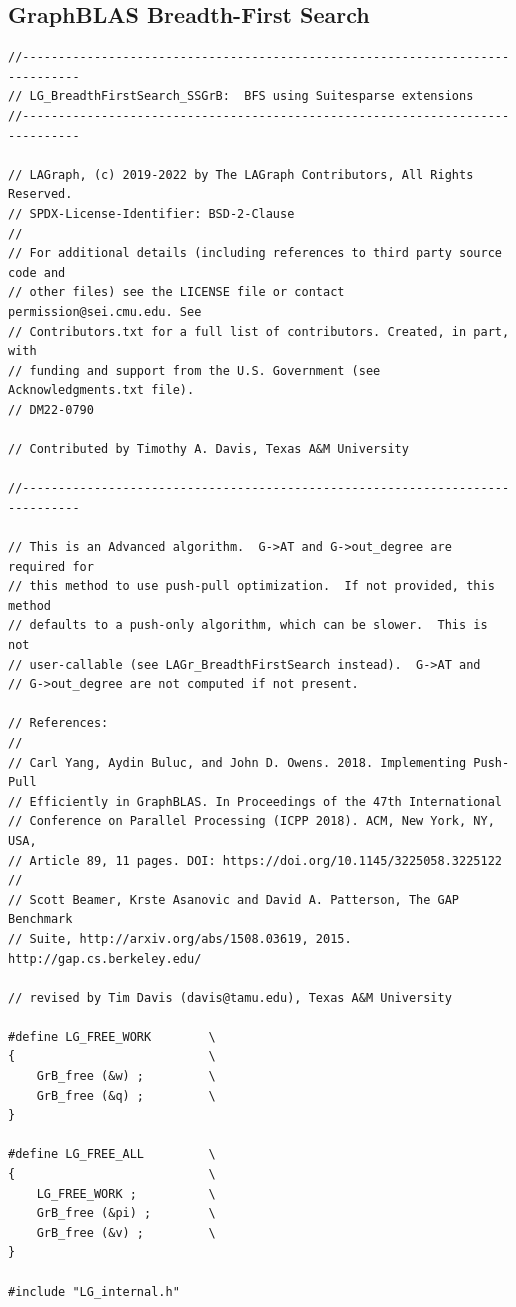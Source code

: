 \subsection{GraphBLAS Breadth-First Search}
\begin{verbatim}
//------------------------------------------------------------------------------
// LG_BreadthFirstSearch_SSGrB:  BFS using Suitesparse extensions
//------------------------------------------------------------------------------

// LAGraph, (c) 2019-2022 by The LAGraph Contributors, All Rights Reserved.
// SPDX-License-Identifier: BSD-2-Clause
//
// For additional details (including references to third party source code and
// other files) see the LICENSE file or contact permission@sei.cmu.edu. See
// Contributors.txt for a full list of contributors. Created, in part, with
// funding and support from the U.S. Government (see Acknowledgments.txt file).
// DM22-0790

// Contributed by Timothy A. Davis, Texas A&M University

//------------------------------------------------------------------------------

// This is an Advanced algorithm.  G->AT and G->out_degree are required for
// this method to use push-pull optimization.  If not provided, this method
// defaults to a push-only algorithm, which can be slower.  This is not
// user-callable (see LAGr_BreadthFirstSearch instead).  G->AT and
// G->out_degree are not computed if not present.

// References:
//
// Carl Yang, Aydin Buluc, and John D. Owens. 2018. Implementing Push-Pull
// Efficiently in GraphBLAS. In Proceedings of the 47th International
// Conference on Parallel Processing (ICPP 2018). ACM, New York, NY, USA,
// Article 89, 11 pages. DOI: https://doi.org/10.1145/3225058.3225122
//
// Scott Beamer, Krste Asanovic and David A. Patterson, The GAP Benchmark
// Suite, http://arxiv.org/abs/1508.03619, 2015.  http://gap.cs.berkeley.edu/

// revised by Tim Davis (davis@tamu.edu), Texas A&M University

#define LG_FREE_WORK        \
{                           \
    GrB_free (&w) ;         \
    GrB_free (&q) ;         \
}

#define LG_FREE_ALL         \
{                           \
    LG_FREE_WORK ;          \
    GrB_free (&pi) ;        \
    GrB_free (&v) ;         \
}

#include "LG_internal.h"


\end{verbatim}

